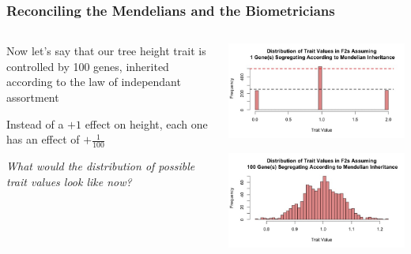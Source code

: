 \documentclass{beamer}
\begin{document}
\begin{frame}
	\frametitle{Reconciling the Mendelians and the Biometricians}
	
	\begin{columns}
		\begin{column}{0.4\textwidth}
			\small	Now let's say that our tree height trait is controlled by 100 genes, inherited according to the law of independant assortment\\
			
			\bigskip
			
			\small Instead of a $+1$ effect on height, each one has an effect of $+\frac{1}{100}$
			 
						\bigskip
			\textit{What would the distribution of possible trait values look like now?} 
			
		\end{column}
		\begin{column}{0.6\textwidth}
			
			\includegraphics[keepaspectratio, width = \textwidth]{img/oneGene} \pause
			
			\includegraphics[keepaspectratio, width = \textwidth]{img/oneHundredGenes}

		\end{column}
	\end{columns}	
	
	
	
\end{frame}
\end{document}
